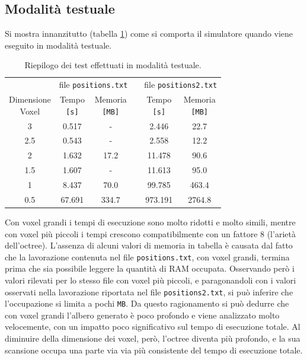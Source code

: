 \subsection{Modalità testuale}
Si mostra innanzitutto (tabella \ref{tab:graphicsnone}) come si comporta il simulatore quando viene eseguito in modalità testuale.
\begin{table}[h]
	\centering
	\begin{tabular}{cccccc}
		\toprule
		& \multicolumn{2}{c}{file \texttt{positions.txt}} & & \multicolumn{2}{c}{file \texttt{positions2.txt}}\\
		\cmidrule(r){2-3}\cmidrule(r){5-6}
			\shortstack{Dimensione\\ Voxel} & \shortstack{Tempo \\\texttt{[s]}} & \shortstack{Memoria \\\texttt{[MB]}} & & \shortstack{Tempo \\\texttt{[s]}} & \shortstack{Memoria \\\texttt{[MB]}}\\
		\midrule
			3   & 0.517  & -     & & 2.446   & 22.7   \\
			2.5 & 0.543  & -     & & 2.558   & 12.2   \\
			2   & 1.632  & 17.2  & & 11.478  & 90.6   \\
			1.5 & 1.607  & -     & & 11.613  & 95.0   \\
			1   & 8.437  & 70.0  & & 99.785  & 463.4  \\
			0.5 & 67.691 & 334.7 & & 973.191 & 2764.8 \\
		\bottomrule
	\end{tabular}
	\caption{Riepilogo dei test effettuati in modalità testuale.}
	\label{tab:graphicsnone}
\end{table}
Con voxel grandi i tempi di esecuzione sono molto ridotti e molto simili, mentre con voxel più piccoli i tempi crescono compatibilmente con un fattore 8 (l'arietà dell'octree). L'assenza di alcuni valori di memoria in tabella è causata dal fatto che la lavorazione contenuta nel file \texttt{positions.txt}, con voxel grandi, termina prima che sia possibile leggere la quantità di RAM occupata. Osservando però i valori rilevati per lo stesso file con voxel più piccoli, e paragonandoli con i valori osservati nella lavorazione riportata nel file \texttt{positions2.txt}, si può inferire che l'occupazione si limita a pochi \texttt{MB}. Da questo ragionamento si può dedurre che con voxel grandi l'albero generato è poco profondo e viene analizzato molto velocemente, con un impatto poco significativo sul tempo di esecuzione totale. Al diminuire della dimensione dei voxel, però, l'octree diventa più profondo, e la sua scansione occupa una parte via via più consistente del tempo di esecuzione totale.

